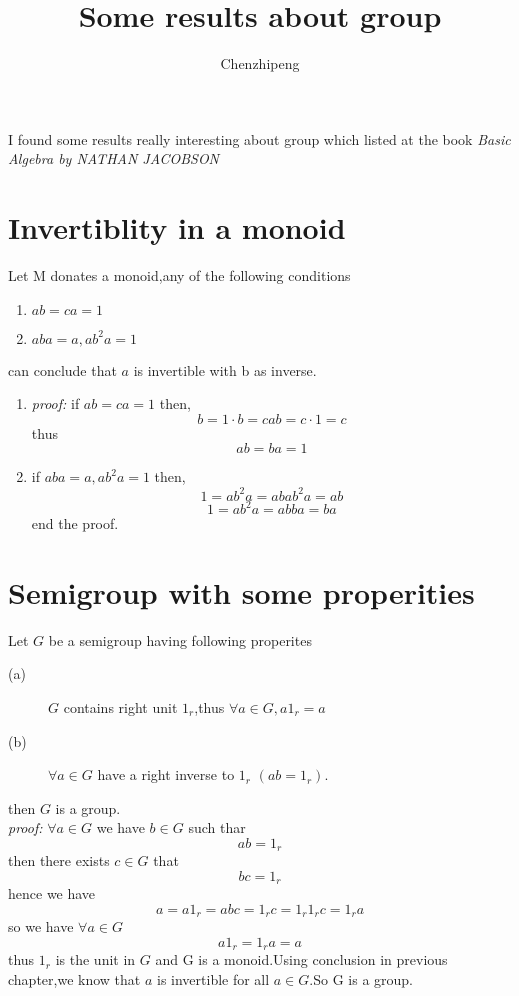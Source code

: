 \documentclass[a4paper,12pt]{article}
\author{Chenzhipeng}
\title{Some results about group}
\begin{document}
\maketitle
I found some results really interesting about group which listed at the book \textit{Basic Algebra by NATHAN JACOBSON}

\section{Invertiblity in a monoid}
Let M donates a monoid,any of the following conditions
\begin{enumerate}
\item
$ ab=ca=1 $
\item
$aba = a, ab^2a = 1$
\end{enumerate}
can conclude that $a$ is invertible with b as inverse.\\

\begin{enumerate}
\item
\textit{proof:} 
if $ ab=ca=1 $ then,
\[ b = 1 \cdot b = cab = c \cdot 1 = c \]
thus 
\[ ab=ba=1 \]
\item
if $aba = a, ab^2a = 1$ then,
\[ 1 = ab^2a = abab^2a = ab \]
\[ 1 = ab^2a = abba = ba \]
end the proof.
\end{enumerate}

\section{Semigroup with some properities}

Let $G$ be a semigroup having following properites 
\begin{description}
\item[(a)]
$G$ contains right unit $1_r$,thus $\forall a \in G, a1_r=a$ \\
\item[(b)]
$\forall a \in G$ have a right inverse to $1_r$ $(ab=1_r)$. \\
\end{description}
then $G$ is a group.\\
\textit{proof:} 
$\forall a \in G$ we have $b \in G$ such thar 
\[ ab = 1_r \]
then there exists $c \in G$ that
\[ bc = 1_r \]
hence we have
\[ a = a 1_r = abc = 1_r c = 1_r 1_r c = 1_r a \]
so we have $\forall a \in G$
\[ a 1_r = 1_r a = a \]
thus $1_r$ is the unit in $G$ and G is a monoid.Using conclusion in previous chapter,we know that $a$ is invertible for all $a \in G$.So G is a group.
\end{document}
